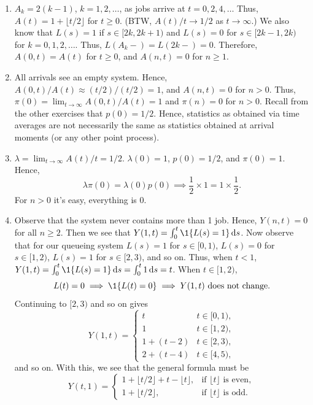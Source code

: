\documentclass[queueing-book.tex]{subfiles}
\begin{document}
\begin{exercise}
\begin{solution}
\begin{enumerate}
\item $A_{k} = 2(k-1)$, $k=1, 2, \ldots$, as jobs arrive at $t=0, 2, 4, \ldots$ Thus, $A(t) = 1 + \lfloor t/2 \rfloor$ for $t \geq 0$.
(BTW, $A(t)/t \to 1/2$ as $t\to \infty$.)
We also know that $L(s)=1$ if $s\in [2k, 2k+1)$ and $L(s)=0$ for $s\in[2k-1, 2k)$ for $k=0, 1, 2, \ldots$.
Thus, $L(A_k-) = L(2k-)=0$.
Therefore, $A(0,t) = A(t)$ for $t \geq 0$, and $A(n,t)=0$ for $n\geq 1$.
\item All arrivals see an empty system.
  Hence, $A(0,t)/A(t) \approx (t/2)/(t/2) = 1$, and $A(n,t)=0$ for $n>0$.
  Thus, $\pi(0) = \lim_{t\to\infty} A(0,t)/A(t) = 1$ and $\pi(n)=0$ for $n>0$.
  Recall from the other exercises that $p(0)=1/2$.
  Hence, statistics as obtained via time averages are not necessarily the same as statistics obtained at arrival moments (or any other point process).
  \item $\lambda = \lim_{t\to\infty} A(t)/t = 1/2$. $\lambda(0)=1$, $p(0)=1/2$, and $\pi(0)=1$. Hence,
\begin{equation*}
 \lambda \pi(0) = \lambda(0) p(0) \implies \frac 1 2 \times 1 = 1\times \frac 1 2.
\end{equation*}
For $n>0$ it's easy, everything is 0.
\item
Observe that the system never contains
 more than 1 job. Hence, $Y(n,t)=0$ for all $n\geq 2$. Then we see that
 $Y(1,t) = \int_0^t \1{\L(s) = 1}\d s$. Now observe that for our
 queueing system $L(s)=1$ for $s\in[0,1)$, $L(s)=0$ for
 $s\in[1,2)$, $L(s)=1$ for $s\in[2,3)$, and so on. Thus, when
 $t<1$, $Y(1,t)=\int_0^t \1{\L(s)=1} \d s = \int_0^t 1\d s = t$.
 When $t\in[1,2)$,
 \begin{equation*}
 L(t)=0 \implies \1{\L(t)=0} \implies Y(1,t) \text{ does not change}.
 \end{equation*}
Continuing to $[2,3)$ and so on gives
 \begin{equation*}
 Y(1,t) =
 \begin{cases}
 t & t\in[0,1), \\
 1 & t\in[1,2), \\
 1+(t-2) & t\in[2,3), \\
 2+(t-4) & t\in[4,5),
 \end{cases}
 \end{equation*}
 and so on. With this, we see that the general formula must be
 \begin{equation*}
Y(t,1) =
 \begin{cases}
1+ \lfloor t/2\rfloor +   t-\lfloor t \rfloor, &\text{if } \lfloor t \rfloor \text{ is even}, \\
1+ \lfloor t/2\rfloor, &\text{if } \lfloor t \rfloor \text{ is odd}.
 \end{cases}
 \end{equation*}


\end{enumerate}
\end{solution}
\end{exercise}
\end{document}
